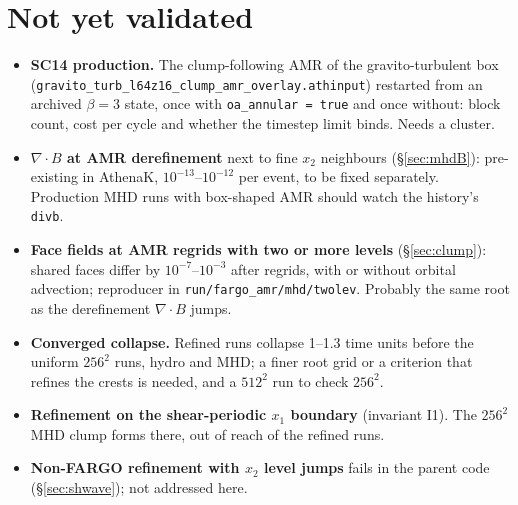\documentclass[11pt]{article}
\newcommand{\code}[1]{\texttt{#1}}
\newcommand{\file}[1]{\texttt{\small #1}}
\begin{document}
\section{Not yet validated}
\label{sec:open}
\begin{itemize}\itemsep2pt
\item \textbf{SC14 production.} The clump-following AMR of the gravito-turbulent box
      (\file{gravito\_turb\_l64z16\_clump\_amr\_overlay.athinput}) restarted from an
      archived $\beta = 3$ state, once with \code{oa\_annular = true} and once without:
      block count, cost per cycle and whether the timestep limit binds. Needs a cluster.
\item \textbf{$\nabla\!\cdot\!B$ at AMR derefinement} next to fine $x_2$ neighbours
      (\S\ref{sec:mhdB}): pre-existing in AthenaK, $10^{-13}$--$10^{-12}$ per event,
      to be fixed separately. Production MHD runs with box-shaped AMR should watch the
      history's \code{divb}.
\item \textbf{Face fields at AMR regrids with two or more levels} (\S\ref{sec:clump}):
      shared faces differ by $10^{-7}$--$10^{-3}$ after regrids, with or without orbital
      advection; reproducer in \file{run/fargo\_amr/mhd/twolev}. Probably the same root as
      the derefinement $\nabla\!\cdot\!B$ jumps.
\item \textbf{Converged collapse.} Refined runs collapse 1--1.3 time units before the
      uniform $256^2$ runs, hydro and MHD; a finer root grid or a criterion that refines
      the crests is needed, and a $512^2$ run to check $256^2$.
\item \textbf{Refinement on the shear-periodic $x_1$ boundary} (invariant I1). The $256^2$
      MHD clump forms there, out of reach of the refined runs.
\item \textbf{Non-FARGO refinement with $x_2$ level jumps} fails in the parent code
      (\S\ref{sec:shwave}); not addressed here.
\end{itemize}

\end{document}
